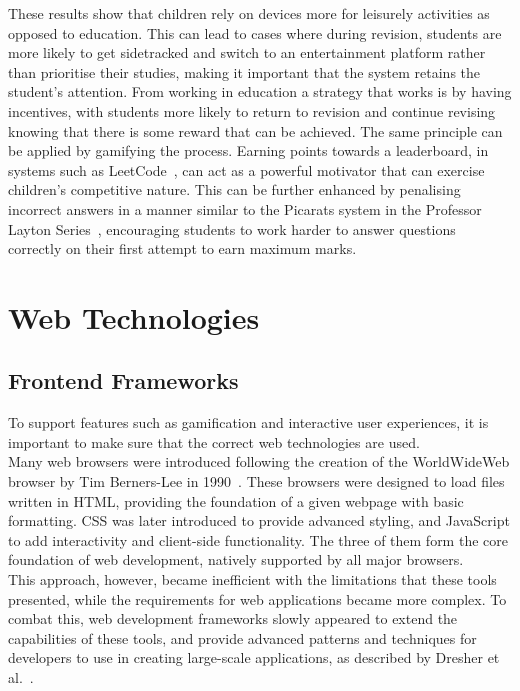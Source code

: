 \documentclass[]{final_report}
\begin{document}
These results show that children rely on devices more for leisurely activities as opposed to education. This can lead to cases where during revision, students are more likely to get sidetracked and switch to an entertainment platform rather than prioritise their studies, making it important that the system retains the student's attention. From working in education a strategy that works is by having incentives, with students more likely to return to revision and continue revising knowing that there is some reward that can be achieved. The same principle can be applied by gamifying the process. Earning points towards a leaderboard, in systems such as LeetCode~\cite{LEETCODE}, can act as a powerful motivator that can exercise children's competitive nature. This can be further enhanced by penalising incorrect answers in a manner similar to the Picarats system in the Professor Layton Series~\cite{LAYTON}, encouraging students to work harder to answer questions correctly on their first attempt to earn maximum marks.

\section{Web Technologies}

\subsection{Frontend Frameworks}

To support features such as gamification and interactive user experiences, it is important to make sure that the correct web technologies are used.\\

Many web browsers were introduced following the creation of the WorldWideWeb browser by Tim Berners-Lee in 1990~\cite{NEXUS}. These browsers were designed to load files written in HTML, providing the foundation of a given webpage with basic formatting. CSS was later introduced to provide advanced styling, and JavaScript to add interactivity and client-side functionality. The three of them form the core foundation of web development, natively supported by all major browsers.\\

This approach, however, became inefficient with the limitations that these tools presented, while the requirements for web applications became more complex. To combat this, web development frameworks slowly appeared to extend the capabilities of these tools, and provide advanced patterns and techniques for developers to use in creating large-scale applications, as described by Dresher et al.~\cite{FRAMEWORKS}.\\
\end{document}
